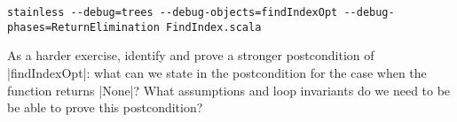 \begin{lstlisting}
stainless --debug=trees --debug-objects=findIndexOpt --debug-phases=ReturnElimination FindIndex.scala
\end{lstlisting}

As a harder exercise, identify and prove a stronger postcondition of |findIndexOpt|:
what can we state in the postcondition for the case when the function returns |None|?
What assumptions and loop invariants do we need to be be able to prove this postcondition?
